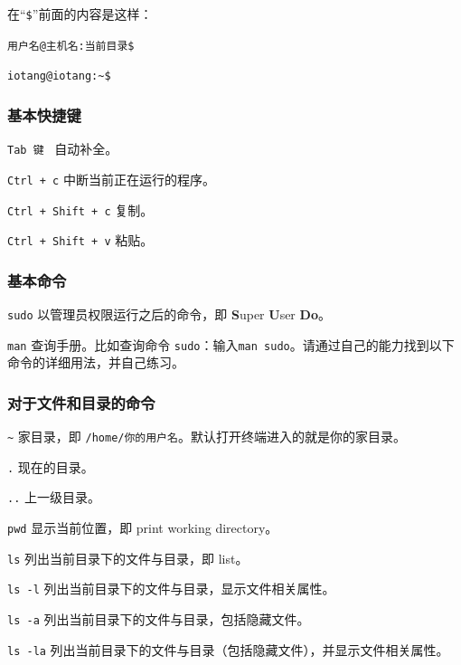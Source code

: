 \documentclass[UTF-8]{ctexart}
\begin{document}
			在“\texttt{\$}”前面的内容是这样：
			
			\texttt{\huge {\color{red}用户名}{\color{brown}@}{\color{olive}主机名}{\color{cyan}:}{\color{blue}当前目录}\$}
			
			\texttt{\huge {\color{red}iotang}{\color{brown}@}{\color{olive}iotang}{\color{cyan}:}{\color{blue}\textasciitilde}\$}
		
			\subsubsection{基本快捷键}
			
				\texttt{Tab 键} ~自动补全。
				
				\texttt{Ctrl + c} 中断当前正在运行的程序。
				
				\texttt{Ctrl + Shift + c} 复制。
				
				\texttt{Ctrl + Shift + v} 粘贴。
			
			\subsubsection{基本命令}
			
				\texttt{sudo} 以管理员权限运行之后的命令，即 \textbf{S}uper \textbf{U}ser \textbf{Do}。
				
				\texttt{man} 查询手册。比如查询命令 \texttt{sudo}：输入\texttt{man sudo}。请通过自己的能力找到以下命令的详细用法，并自己练习。
			
			\subsubsection{对于文件和目录的命令}
			
				\texttt{\textasciitilde} 家目录，即 \texttt{/home/你的用户名}。默认打开终端进入的就是你的家目录。
				
				\texttt{.} 现在的目录。
				
				\texttt{..} 上一级目录。
				
				\texttt{pwd} 显示当前位置，即 print working directory。
				
				\texttt{ls} 列出当前目录下的文件与目录，即 list。
				
				\texttt{ls -l} 列出当前目录下的文件与目录，显示文件相关属性。
				
				\texttt{ls -a} 列出当前目录下的文件与目录，包括隐藏文件。
				
				\texttt{ls -la} 列出当前目录下的文件与目录（包括隐藏文件），并显示文件相关属性。
				
\end{document}
